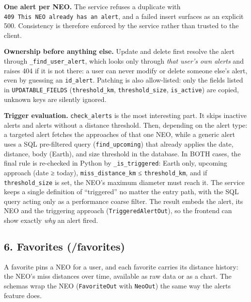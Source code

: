 \documentclass[
  french,
  11pt,
  a4paper,
]{report}
\begin{document}
\textbf{One alert per NEO.} The service refuses a duplicate with
\texttt{409\ This\ NEO\ already\ has\ an\ alert}, and a failed insert
surfaces as an explicit 500. Consistency is therefore enforced by the
service rather than trusted to the client.

\textbf{Ownership before anything else.} Update and delete first resolve
the alert through \texttt{\_find\_user\_alert}, which looks only through
\emph{that user's own alerts} and raises 404 if it is not there: a user
can never modify or delete someone else's alert, even by guessing an
\texttt{id\_alert}. Patching is also allow-listed: only the fields
listed in \texttt{UPDATABLE\_FIELDS} (\texttt{threshold\_km},
\texttt{threshold\_size}, \texttt{is\_active}) are copied, unknown keys
are silently ignored.

\textbf{Trigger evaluation.} \texttt{check\_alerts} is the most
interesting part. It skips inactive alerts and alerts without a distance
threshold. Then, depending on the alert type: a targeted alert fetches
the approaches of that one NEO, while a generic alert uses a SQL
pre-filtered query (\texttt{find\_upcoming}) that already applies the
date, distance, body (Earth), and size threshold in the database. In
BOTH cases, the final rule is re-checked in Python by
\texttt{\_is\_triggered}: Earth only, upcoming approach (date ≥ today),
\texttt{miss\_distance\_km} ≤ \texttt{threshold\_km}, and if
\texttt{threshold\_size} is set, the NEO's maximum diameter must reach
it. The service keeps a single definition of ``triggered'' no matter the
entry path, with the SQL query acting only as a performance coarse
filter. The result embeds the alert, its NEO and the triggering approach
(\texttt{TriggeredAlertOut}), so the frontend can show exactly
\emph{why} an alert fired.

\subsection{6. Favorites (/favorites)}\label{favorites-favorites}

A favorite pins a NEO for a user, and each favorite carries its distance
history: the NEO's miss distances over time, available as raw data or as
a chart. The schemas wrap the NEO (\texttt{FavoriteOut} with
\texttt{NeoOut}) the same way the alerts feature does.
\end{document}
